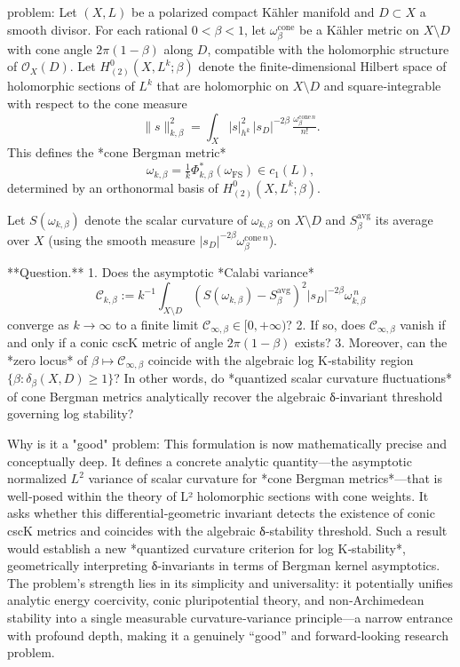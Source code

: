 problem:  
Let \((X,L)\) be a polarized compact Kähler manifold and \(D\subset X\) a smooth divisor.  For each rational \(0<\beta<1\), let \(\omega_{\beta}^{\mathrm{cone}}\) be a Kähler metric on \(X\setminus D\) with cone angle \(2\pi(1-\beta)\) along \(D\), compatible with the holomorphic structure of \(\mathcal O_X(D)\).  
Let \(H^0_{(2)}(X,L^k; \beta)\) denote the finite‑dimensional Hilbert space of holomorphic sections of \(L^k\) that are holomorphic on \(X\setminus D\) and square‑integrable with respect to the cone measure
\[
\|s\|_{k,\beta}^2
=\int_X |s|_{h^k}^2\, |s_D|^{-2\beta}\, \tfrac{\omega_{\beta}^{\mathrm{cone}\,n}}{n!}.
\]
This defines the *cone Bergman metric*
\[
\omega_{k,\beta}=\tfrac1k \Phi_{k,\beta}^*(\omega_{\mathrm{FS}})
\in c_1(L),
\]
determined by an orthonormal basis of \(H^0_{(2)}(X,L^k; \beta)\).

Let \(S(\omega_{k,\beta})\) denote the scalar curvature of \(\omega_{k,\beta}\) on \(X\setminus D\) and \(S_{\beta}^{\mathrm{avg}}\) its average over \(X\) (using the smooth measure \(|s_D|^{-2\beta}\omega_{\beta}^{\mathrm{cone}\,n}\)).

**Question.**  
1. Does the asymptotic *Calabi variance*  
   \[
   \mathcal C_{k,\beta}:=k^{-1}\!\int_{X\setminus D}\!\!
      (S(\omega_{k,\beta})-S_{\beta}^{\mathrm{avg}})^2
      |s_D|^{-2\beta}\omega_{k,\beta}^{\,n}
   \]
   converge as \(k\to\infty\) to a finite limit
   \(\mathcal C_{\infty,\beta}\in[0,+\infty)\)?  
2. If so, does \(\mathcal C_{\infty,\beta}\) vanish if and only if
   a conic cscK metric of angle \(2\pi(1-\beta)\) exists?  
3. Moreover, can the *zero locus* of \(\beta\mapsto \mathcal C_{\infty,\beta}\)
   coincide with the algebraic log K‑stability region
   \(\{\beta: \delta_\beta(X,D)\ge 1\}\)?  
In other words, do *quantized scalar curvature fluctuations* of cone Bergman metrics analytically recover the algebraic δ‑invariant threshold governing log stability?

Why is it a "good" problem:  
This formulation is now mathematically precise and conceptually deep.  It defines a concrete analytic quantity—the asymptotic normalized \(L^2\) variance of scalar curvature for *cone Bergman metrics*—that is well‑posed within the theory of L² holomorphic sections with cone weights.  It asks whether this differential‑geometric invariant detects the existence of conic cscK metrics and coincides with the algebraic δ‑stability threshold.  Such a result would establish a new *quantized curvature criterion for log K‑stability*, geometrically interpreting δ‑invariants in terms of Bergman kernel asymptotics.  The problem’s strength lies in its simplicity and universality: it potentially unifies analytic energy coercivity, conic pluripotential theory, and non‑Archimedean stability into a single measurable curvature‑variance principle—a narrow entrance with profound depth, making it a genuinely “good” and forward‑looking research problem.
